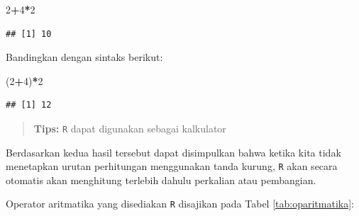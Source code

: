 \documentclass[]{book}
\newenvironment{Shaded}{\begin{snugshade}}{\end{snugshade}}
\newcommand{\DecValTok}[1]{\textcolor[rgb]{0.00,0.00,0.81}{#1}}
\newcommand{\NormalTok}[1]{#1}
\newcommand{\OperatorTok}[1]{\textcolor[rgb]{0.81,0.36,0.00}{\textbf{#1}}}
\theoremstyle{definition}
\theoremstyle{definition}
\theoremstyle{definition}
\theoremstyle{remark}
\begin{document}
\begin{Shaded}
\begin{Highlighting}[]
\DecValTok{2}\OperatorTok{+}\DecValTok{4}\OperatorTok{*}\DecValTok{2}
\end{Highlighting}
\end{Shaded}

\begin{verbatim}
## [1] 10
\end{verbatim}

Bandingkan dengan sintaks berikut:

\begin{Shaded}
\begin{Highlighting}[]
\NormalTok{(}\DecValTok{2}\OperatorTok{+}\DecValTok{4}\NormalTok{)}\OperatorTok{*}\DecValTok{2}
\end{Highlighting}
\end{Shaded}

\begin{verbatim}
## [1] 12
\end{verbatim}

\begin{quote}
\textbf{Tips:} \texttt{R} dapat digunakan sebagai kalkulator
\end{quote}

Berdasarkan kedua hasil tersebut dapat disimpulkan bahwa ketika kita tidak menetapkan urutan perhitungan menggunakan tanda kurung, \texttt{R} akan secara otomatis akan menghitung terlebih dahulu perkalian atau pembangian.

Operator aritmatika yang disediakan \texttt{R} disajikan pada Tabel \ref{tab:oparitmatika}:
\end{document}
